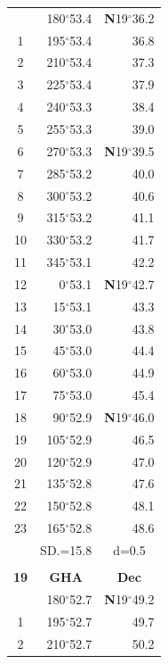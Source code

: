 \documentclass[10pt, a4paper]{report}
\begin{document}
\begin{scriptsize}
\begin{tabular*}{0.2\textwidth}[t]{@{\extracolsep{\fill}}|c|rr|}
\hline\rule{0pt}{2.6ex}\noindent
0 & 180$^\circ$53.4 & \textbf{N}19$^\circ$36.2\\
1 & 195$^\circ$53.4 & 36.8\\
2 & 210$^\circ$53.4 & 37.3\\
3 & 225$^\circ$53.4 & \raisebox{0.24ex}{\boldmath$\cdot$~\boldmath$\cdot$~~}37.9\\
4 & 240$^\circ$53.3 & 38.4\\
5 & 255$^\circ$53.3 & 39.0\\[2Pt]
6 & 270$^\circ$53.3 & \textbf{N}19$^\circ$39.5\\
7 & 285$^\circ$53.2 & 40.0\\
8 & 300$^\circ$53.2 & 40.6\\
9 & 315$^\circ$53.2 & \raisebox{0.24ex}{\boldmath$\cdot$~\boldmath$\cdot$~~}41.1\\
10 & 330$^\circ$53.2 & 41.7\\
11 & 345$^\circ$53.1 & 42.2\\[2Pt]
12 & 0$^\circ$53.1 & \textbf{N}19$^\circ$42.7\\
13 & 15$^\circ$53.1 & 43.3\\
14 & 30$^\circ$53.0 & 43.8\\
15 & 45$^\circ$53.0 & \raisebox{0.24ex}{\boldmath$\cdot$~\boldmath$\cdot$~~}44.4\\
16 & 60$^\circ$53.0 & 44.9\\
17 & 75$^\circ$53.0 & 45.4\\[2Pt]
18 & 90$^\circ$52.9 & \textbf{N}19$^\circ$46.0\\
19 & 105$^\circ$52.9 & 46.5\\
20 & 120$^\circ$52.9 & 47.0\\
21 & 135$^\circ$52.8 & \raisebox{0.24ex}{\boldmath$\cdot$~\boldmath$\cdot$~~}47.6\\
22 & 150$^\circ$52.8 & 48.1\\
23 & 165$^\circ$52.8 & 48.6\\
\hline
\rule{0pt}{2.4ex} & \multicolumn{1}{c}{SD.=15.8} & \multicolumn{1}{c|}{d=0.5}\\
\hline
\multicolumn{1}{c}{}\\[-0.5ex]\hline
\multicolumn{1}{|c|}{\rule{0pt}{2.6ex}\textbf{19}} & \multicolumn{1}{c}{\textbf{GHA}} & \multicolumn{1}{c|}{\textbf{Dec}}\\
\hline\rule{0pt}{2.6ex}\noindent
0 & 180$^\circ$52.7 & \textbf{N}19$^\circ$49.2\\
1 & 195$^\circ$52.7 & 49.7\\
2 & 210$^\circ$52.7 & 50.2\\

\end{tabular*}
\end{scriptsize}
\end{document}

